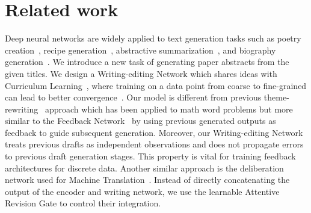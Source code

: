 \documentclass[11pt,a4paper]{article}
\begin{document}
 








 \section{Related work}






Deep neural networks are widely applied to text generation tasks such as poetry creation~\citep{kk1, kk2, creativepoetry17}, recipe generation~\citep{checklist16}, abstractive summarization~\citep{copynet16,absg16,hybridp17}, and biography generation~\citep{biogen16,table2text17}. We introduce a new task of generating paper abstracts from the given titles. We design a Writing-editing Network which shares ideas with Curriculum Learning~\citep{bengio2009curriculum}, where training on a data point from coarse to fine-grained can lead to better convergence~\citep{krueger2009flexible}. Our model is different from previous theme-rewriting~\citep{rewriting15,rewriting16} approach which has been applied to math word problems but more similar to the Feedback Network~\citep{16feedback} by using previous generated outputs as feedback to guide subsequent generation. Moreover, our Writing-editing Network treats previous drafts as independent observations and does not propagate errors to previous draft generation stages. This property is vital for training feedback architectures for discrete data. Another similar approach is the deliberation network used for Machine Translation~\citep{deliberation}. 
Instead of directly concatenating the output of the encoder and writing network, we use the learnable Attentive Revision Gate to control their integration.
\end{document}
